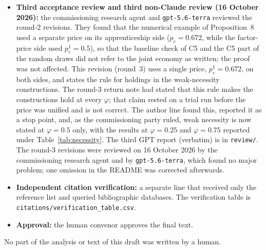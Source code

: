 \documentclass[12pt]{article}
\theoremstyle{remark}
\begin{document}
\begin{itemize}[itemsep=1pt]
\item \textbf{Third acceptance review and third non-Claude review (16 October 2026):} the commissioning research agent and \texttt{gpt-5.6-terra} reviewed the round-2 revisions. They found that the numerical example of Proposition~8 used a separate price on its apprenticeship side ($p_c=0.672$, while the factor-price side used $p_c^1=0.5$), so that the baseline check of C5 and the C5 part of the random draws did not refer to the joint economy as written; the proof was not affected. This revision (round~3) uses a single price, $p_c^1=0.672$, on both sides, and states the rule for holdings in the weak-necessity constructions. The round-3 return note had stated that this rule makes the constructions hold at every $\varphi$; that claim rested on a trial run before the price was unified and is not correct. The author line found this, reported it as a stop point, and, as the commissioning party ruled, weak necessity is now stated at $\varphi=0.5$ only, with the results at $\varphi=0.25$ and $\varphi=0.75$ reported under Table~\ref{tab:necessity}. The third GPT report (verbatim) is in \texttt{review/}. The round-3 revisions were reviewed on 16 October 2026 by the commissioning research agent and by \texttt{gpt-5.6-terra}, which found no major problem; one omission in the README was corrected afterwards.
\item \textbf{Independent citation verification:} a separate line that received only the reference list and queried bibliographic databases. The verification table is \texttt{citations/verification\_table.csv}.
\item \textbf{Approval:} the human convenor approves the final text.
\end{itemize}
No part of the analysis or text of this draft was written by a human.



\end{document}
